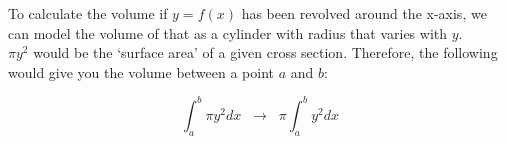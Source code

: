 \documentclass{article}
\begin{document}
\noindent To calculate the volume if \(y=f(x)\) has been revolved around the x-axis, we can model the volume of that as a cylinder with radius that varies with \(y\). \\
\(\pi y^2\) would be the `surface area' of a given cross section. Therefore, the following would give you the volume between a point \(a\) and \(b\):

\[\int^b_a\pi y^2dx \;\;\rightarrow\;\; \pi\int^b_ay^2dx\]
\end{document}
